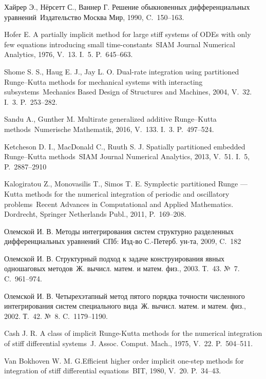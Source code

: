 \documentclass[a4paper,article,14pt]{extarticle}
\begin{document}
\begin{thebibliography}{1}
 Хайрер Э., Нёрсетт С., Ваннер Г. \flqq Решение обыкновенных дифференциальных уравнений\frqq~Издательство Москва Мир, 1990, C.~150--163.

 Hofer E. \flqq A partially implicit method for large stiff systems of ODEs with only few equations
introducing small time-constants\frqq~SIAM Journal Numerical Analytics, 1976, V.~13. I.~5. P.~645--663.

 Shome S. S., Haug E. J., Jay L. O. \flqq Dual-rate integration using partitioned Runge--Kutta methods for mechanical systems with interacting subsystems\frqq~Mechanics Based Design of Structures and Machines, 2004, V.~32. I.~3. P.~253--282.

 Sandu A., Gunther M. \flqq Multirate generalized additive Runge--Kutta methods\frqq~Numerische Mathematik, 2016, V.~133. I.~3. P.~497--524.

 Ketcheson D. I., MacDonald C., Ruuth S. J. \flqq Spatially partitioned embedded Runge--Kutta methods\frqq~SIAM Journal Numerical Analytics, 2013, V.~51. I.~5, P.~2887--2910

 Kalogiratou Z., Monovasilis T., Simos T. E. \flqq Symplectic partitioned Runge — Kutta methods for the numerical integration of periodic and oscillatory problems\frqq~Recent Advances in Computational and Applied Mathematics. Dordrecht, Springer Netherlands Publ., 2011, P.~169--208.

 Олемской И. В. \flqq Методы интегрирования систем структурно разделенных дифференциальных уравнений\frqq~СПб: Изд-во С.-Петерб. ун-та, 2009, C.~182

  Олемской И. В. \flqq Структурный подход к задаче конструирования явных одношаговых методов\frqq~Ж. вычисл. матем. и матем. физ., 2003. Т.~43. №~7. C.~961--974.

 Олемской И. В. \flqq Четырехэтапный метод пятого порядка точности численного интегрирования систем специального вида\frqq~Ж. вычисл. матем. и матем. физ., 2002. Т.~42. №~8. C.~1179--1190.

 Cash J. R. \flqq A class of implicit Runge-Kutta methods for the numerical integration of stiff differential systems\frqq~J. Assoc. Comput. Mach., 1975, V.~22. P.~504--511.

 Van Bokhoven W. M. G.\flqq Efficient higher order implicit one-step methods for integration of stiff differential equations\frqq~BIT, 1980, V.~20. P.~34--43.


\end{thebibliography}
\end{document}
